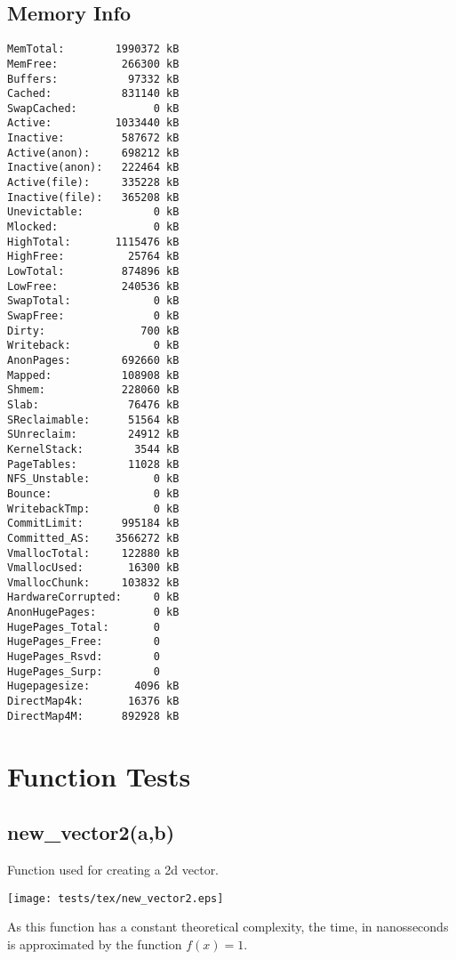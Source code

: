 \documentclass{article}
\begin{document}
\subsection{Memory Info}
\begin{verbatim}
MemTotal:        1990372 kB
MemFree:          266300 kB
Buffers:           97332 kB
Cached:           831140 kB
SwapCached:            0 kB
Active:          1033440 kB
Inactive:         587672 kB
Active(anon):     698212 kB
Inactive(anon):   222464 kB
Active(file):     335228 kB
Inactive(file):   365208 kB
Unevictable:           0 kB
Mlocked:               0 kB
HighTotal:       1115476 kB
HighFree:          25764 kB
LowTotal:         874896 kB
LowFree:          240536 kB
SwapTotal:             0 kB
SwapFree:              0 kB
Dirty:               700 kB
Writeback:             0 kB
AnonPages:        692660 kB
Mapped:           108908 kB
Shmem:            228060 kB
Slab:              76476 kB
SReclaimable:      51564 kB
SUnreclaim:        24912 kB
KernelStack:        3544 kB
PageTables:        11028 kB
NFS_Unstable:          0 kB
Bounce:                0 kB
WritebackTmp:          0 kB
CommitLimit:      995184 kB
Committed_AS:    3566272 kB
VmallocTotal:     122880 kB
VmallocUsed:       16300 kB
VmallocChunk:     103832 kB
HardwareCorrupted:     0 kB
AnonHugePages:         0 kB
HugePages_Total:       0
HugePages_Free:        0
HugePages_Rsvd:        0
HugePages_Surp:        0
Hugepagesize:       4096 kB
DirectMap4k:       16376 kB
DirectMap4M:      892928 kB
\end{verbatim}
\section{Function Tests}
\subsection{new\_vector2(a,b)}
Function used for creating a 2d vector.


\texttt{[image: tests/tex/new\_vector2.eps]}

As this function has a constant theoretical
complexity, the time, in nanosseconds is 
approximated by the function $f(x)=1$.
\end{document}
